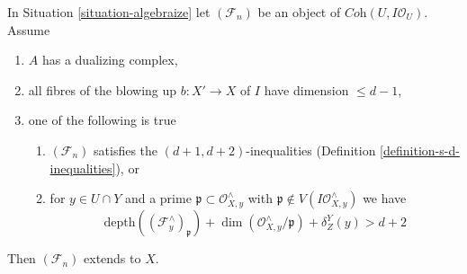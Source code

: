 %
\begin{lemma}
\label{lemma-blowup}
In Situation \ref{situation-algebraize} let $(\mathcal{F}_n)$
be an object of $\textit{Coh}(U, I\mathcal{O}_U)$. Assume
\begin{enumerate}
\item $A$ has a dualizing complex,
\item all fibres of the blowing up $b : X' \to X$ of $I$
have dimension $\leq d - 1$,
\item one of the following is true
\begin{enumerate}
\item $(\mathcal{F}_n)$ satisfies the $(d + 1, d + 2)$-inequalities
(Definition \ref{definition-s-d-inequalities}), or
\item for $y \in U \cap Y$ and a prime
$\mathfrak p \subset \mathcal{O}_{X, y}^\wedge$ with
$\mathfrak p \not \in V(I\mathcal{O}_{X, y}^\wedge)$
we have
$$
\text{depth}((\mathcal{F}^\wedge_y)_\mathfrak p) +
\dim(\mathcal{O}_{X, y}^\wedge/\mathfrak p) + \delta^Y_Z(y) > d + 2
$$
\end{enumerate}
\end{enumerate}
Then $(\mathcal{F}_n)$ extends to $X$.
\end{lemma}

